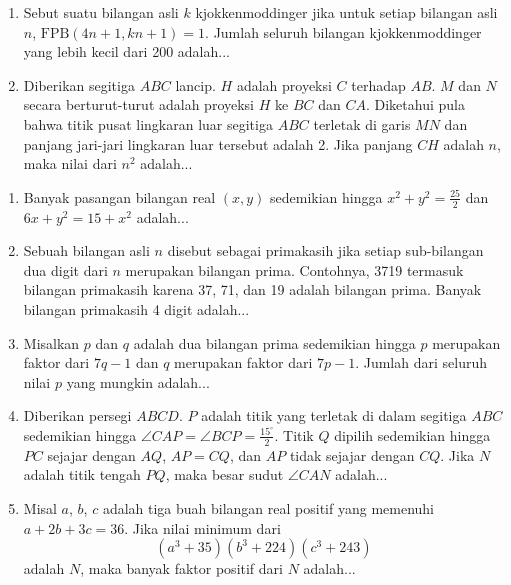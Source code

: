 \documentclass[12pt]{scrartcl}
\begin{document}
\begin{enumerate}
        $$bc + \frac{1}{a} = ca + \frac{2}{b} = ab + \frac{7}{c} = \frac{1}{a + b + c}$$
        Nilai dari $a^3 + 8b^3 + c^3$ adalah...
    \item Sebut suatu bilangan asli $k$ kjokkenmoddinger jika untuk setiap bilangan asli $n$, $\text{FPB}(4n+1, kn+1) = 1$. Jumlah seluruh bilangan kjokkenmoddinger yang lebih kecil dari 200 adalah...
    \item Diberikan segitiga $ABC$ lancip. $H$ adalah proyeksi $C$ terhadap $AB$. $M$ dan $N$ secara berturut-turut adalah proyeksi $H$ ke $BC$ dan $CA$. Diketahui pula bahwa titik pusat lingkaran luar segitiga $ABC$ terletak di garis $MN$ dan panjang jari-jari lingkaran luar tersebut adalah 2. Jika panjang $CH$ adalah $n$, maka nilai dari $n^2$ adalah...
\end{enumerate}

\begin{enumerate}[resume]
    \item Banyak pasangan bilangan real $(x, y)$ sedemikian hingga $x^2 + y^2 = \frac{25}{2}$ dan $6x + y^2 = 15 + x^2$ adalah...
    \item Sebuah bilangan asli $n$ disebut sebagai primakasih jika setiap sub-bilangan dua digit dari $n$ merupakan bilangan prima. Contohnya, 3719 termasuk bilangan primakasih karena 37, 71, dan 19 adalah bilangan prima. Banyak bilangan primakasih 4 digit adalah...
    \item Misalkan $p$ dan $q$ adalah dua bilangan prima sedemikian hingga $p$ merupakan faktor dari $7q - 1$ dan $q$ merupakan faktor dari $7p - 1$. Jumlah dari seluruh nilai $p$ yang mungkin adalah...
    \item Diberikan persegi $ABCD$. $P$ adalah titik yang terletak di dalam segitiga $ABC$ sedemikian hingga $\angle CAP = \angle BCP = \frac{15^\circ}{2}$. Titik $Q$ dipilih sedemikian hingga $PC$ sejajar dengan $AQ$, $AP = CQ$, dan $AP$ tidak sejajar dengan $CQ$. Jika $N$ adalah titik tengah $PQ$, maka besar sudut $\angle CAN$ adalah...
    \item Misal $a$, $b$, $c$ adalah tiga buah bilangan real positif yang memenuhi $a + 2b + 3c = 36$. Jika nilai minimum dari
        $$(a^3 + 35)(b^3 + 224)(c^3 + 243)$$
        adalah $N$, maka banyak faktor positif dari $N$ adalah...
\end{enumerate}
\end{document}
